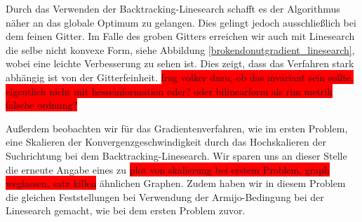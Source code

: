 Durch das Verwenden der Backtracking-Linesearch schafft es der Algorithmus näher an das globale Optimum zu gelangen. Dies gelingt jedoch ausschließlich bei dem feinen Gitter. Im Falle des groben Gitters erreichen wir auch mit Linesearch die selbe nicht konvexe Form, siehe Abbildung \ref{brokendonutgradient_linesearch}, wobei eine leichte Verbesserung zu sehen ist. Dies zeigt, dass das Verfahren stark abhängig ist von der Gitterfeinheit. \colorbox{red}{frag volker dazu, ob das invariant sein sollte. eigentlich nicht mit hesseinformation oder? oder bilinearform als rim metrik falsche ordnung?}

Außerdem beobachten wir für das Gradientenverfahren, wie im ersten Problem, eine Skalieren der Konvergenzgeschwindigkeit durch das Hochskalieren der Suchrichtung bei dem Backtracking-Linesearch. Wir sparen uns an dieser Stelle die erneute Angabe eines zu \colorbox{red}{plot von skalierung bei erstem Problem, graph weglassen, satz killen} ähnlichen Graphen.
Zudem haben wir in diesem Problem die gleichen Feststellungen bei Verwendung der Armijo-Bedingung bei der Linesearch gemacht, wie bei dem ersten Problem zuvor.

